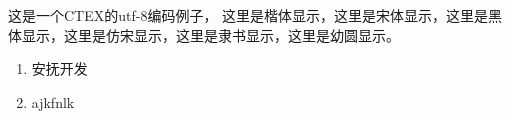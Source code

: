 \documentclass[UTF8]{article}
\begin{document}
这是一个CTEX的utf-8编码例子，
{\kaishu 这里是楷体显示}，{\songti 这里是宋体显示}，{\heiti 这里是黑体显示}，{\fangsong 这里是仿宋显示}，{\lishu 这里是隶书显示}，{\youyuan 这里是幼圆显示}。
\begin{enumerate}
	\item 安抚开发
	\item  ajkfnlk
\end{enumerate}
\end{document}
